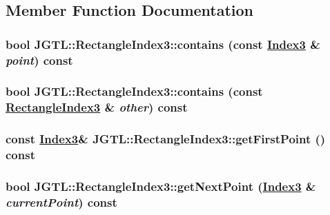 \subsection{Member Function Documentation}
\hypertarget{class_j_g_t_l_1_1_rectangle_index3_684d5b35b495248a08c58934733708d7}{
\subsubsection[contains]{\setlength{\rightskip}{0pt plus 5cm}bool JGTL::Rectangle\-Index3::contains (const \hyperlink{class_j_g_t_l_1_1_index3}{Index3} \& {\em point}) const}}
\label{class_j_g_t_l_1_1_rectangle_index3_684d5b35b495248a08c58934733708d7}


\hypertarget{class_j_g_t_l_1_1_rectangle_index3_40566e129adc34414f121d381b0e9778}{
\subsubsection[contains]{\setlength{\rightskip}{0pt plus 5cm}bool JGTL::Rectangle\-Index3::contains (const \hyperlink{class_j_g_t_l_1_1_rectangle_index3}{Rectangle\-Index3} \& {\em other}) const}}
\label{class_j_g_t_l_1_1_rectangle_index3_40566e129adc34414f121d381b0e9778}


\hypertarget{class_j_g_t_l_1_1_rectangle_index3_8d6af8973681aa05eef77cc81ab5423d}{
\subsubsection[getFirstPoint]{\setlength{\rightskip}{0pt plus 5cm}const \hyperlink{class_j_g_t_l_1_1_index3}{Index3}\& JGTL::Rectangle\-Index3::get\-First\-Point () const}}
\label{class_j_g_t_l_1_1_rectangle_index3_8d6af8973681aa05eef77cc81ab5423d}


\hypertarget{class_j_g_t_l_1_1_rectangle_index3_a81e5102d4fe3a7295ed65893eff8c65}{
\subsubsection[getNextPoint]{\setlength{\rightskip}{0pt plus 5cm}bool JGTL::Rectangle\-Index3::get\-Next\-Point (\hyperlink{class_j_g_t_l_1_1_index3}{Index3} \& {\em current\-Point}) const}}
\label{class_j_g_t_l_1_1_rectangle_index3_a81e5102d4fe3a7295ed65893eff8c65}


